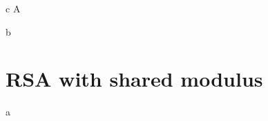 \documentclass{article}
\begin{document}
\begin{paragraph}
	c A
\end{paragraph}

\begin{paragraph}
	b 
\end{paragraph}

\section{RSA with shared modulus}
\begin{paragraph}
	a 
\end{paragraph}
\end{document}
